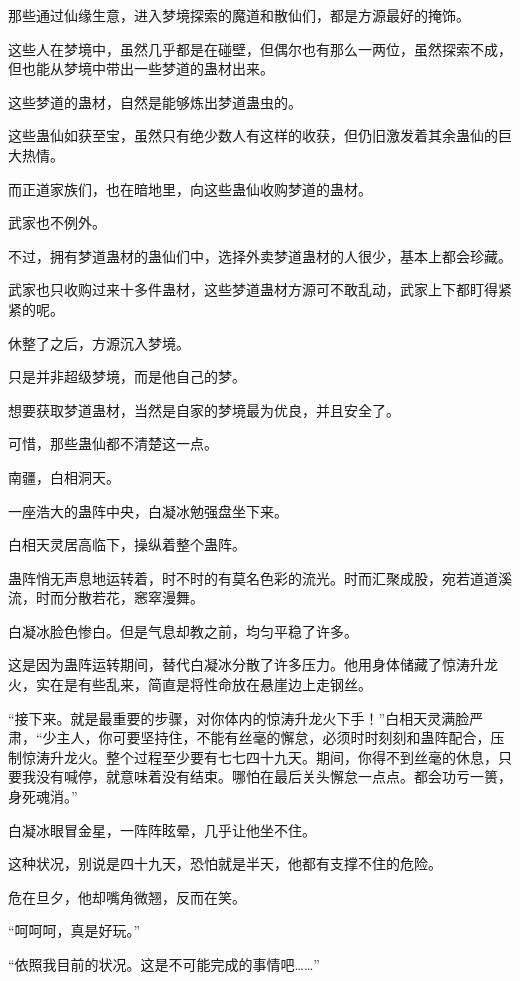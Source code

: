 \begin{this_body}
那些通过仙缘生意，进入梦境探索的魔道和散仙们，都是方源最好的掩饰。

这些人在梦境中，虽然几乎都是在碰壁，但偶尔也有那么一两位，虽然探索不成，但也能从梦境中带出一些梦道的蛊材出来。

这些梦道的蛊材，自然是能够炼出梦道蛊虫的。

这些蛊仙如获至宝，虽然只有绝少数人有这样的收获，但仍旧激发着其余蛊仙的巨大热情。

而正道家族们，也在暗地里，向这些蛊仙收购梦道的蛊材。

武家也不例外。

不过，拥有梦道蛊材的蛊仙们中，选择外卖梦道蛊材的人很少，基本上都会珍藏。

武家也只收购过来十多件蛊材，这些梦道蛊材方源可不敢乱动，武家上下都盯得紧紧的呢。

休整了之后，方源沉入梦境。

只是并非超级梦境，而是他自己的梦。

想要获取梦道蛊材，当然是自家的梦境最为优良，并且安全了。

可惜，那些蛊仙都不清楚这一点。

南疆，白相洞天。

一座浩大的蛊阵中央，白凝冰勉强盘坐下来。

白相天灵居高临下，操纵着整个蛊阵。

蛊阵悄无声息地运转着，时不时的有莫名色彩的流光。时而汇聚成股，宛若道道溪流，时而分散若花，窸窣漫舞。

白凝冰脸色惨白。但是气息却教之前，均匀平稳了许多。

这是因为蛊阵运转期间，替代白凝冰分散了许多压力。他用身体储藏了惊涛升龙火，实在是有些乱来，简直是将性命放在悬崖边上走钢丝。

“接下来。就是最重要的步骤，对你体内的惊涛升龙火下手！”白相天灵满脸严肃，“少主人，你可要坚持住，不能有丝毫的懈怠，必须时时刻刻和蛊阵配合，压制惊涛升龙火。整个过程至少要有七七四十九天。期间，你得不到丝毫的休息，只要我没有喊停，就意味着没有结束。哪怕在最后关头懈怠一点点。都会功亏一篑，身死魂消。”

白凝冰眼冒金星，一阵阵眩晕，几乎让他坐不住。

这种状况，别说是四十九天，恐怕就是半天，他都有支撑不住的危险。

危在旦夕，他却嘴角微翘，反而在笑。

“呵呵呵，真是好玩。”

“依照我目前的状况。这是不可能完成的事情吧……”


\end{this_body}
